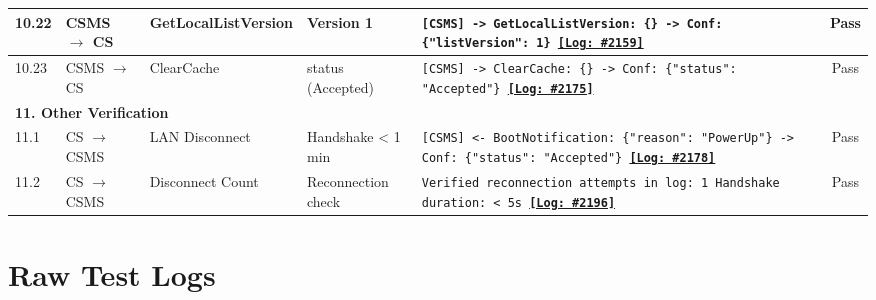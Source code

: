 \documentclass[10pt, a4paper, landscape]{article}
\begin{document}
\begin{longtable}{|p{1.0cm}|p{2.5cm}|p{4.0cm}|p{5.0cm}|p{10.0cm}|c|}
\hline
10.22 & CSMS $\to$ CS & GetLocalListVersion & Version 1 & \footnotesize\texttt{[CSMS] -> GetLocalListVersion: \{\} \newline [CS] -> Conf: \{"listVersion": 1\} \newline \hyperref[log:10.22]{\textbf{[Log: \#2159]}}} & Pass \\
\hline
10.23 & CSMS $\to$ CS & ClearCache & status (Accepted) & \footnotesize\texttt{[CSMS] -> ClearCache: \{\} \newline [CS] -> Conf: \{"status": "Accepted"\} \newline \hyperref[log:10.23]{\textbf{[Log: \#2175]}}} & Pass \\
\hline

\multicolumn{6}{|l|}{\cellcolor{blue!10}\textbf{11. Other Verification}} \\
\hline
11.1 & CS $\to$ CSMS & LAN Disconnect & Handshake < 1 min & \footnotesize\texttt{[CSMS] <- BootNotification: \{"reason": "PowerUp"\} \newline [CSMS] -> Conf: \{"status": "Accepted"\} \newline \hyperref[log:11.1]{\textbf{[Log: \#2178]}}} & Pass \\
\hline
11.2 & CS $\to$ CSMS & Disconnect Count & Reconnection check & \footnotesize\texttt{Verified reconnection attempts in log: 1 \newline Handshake duration: < 5s \newline \hyperref[log:11.2]{\textbf{[Log: \#2196]}}} & Pass \\
\hline
\end{longtable}
\newpage
\appendix
\section{Raw Test Logs}
\label{sec:raw_logs}
\normalsize

\end{document}
